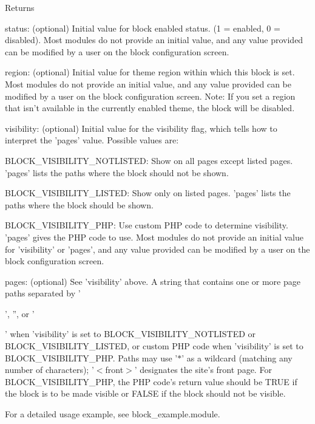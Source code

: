 \begin{DoxyReturn}{Returns}
\begin{DoxyItemize}
\item status: (optional) Initial value for block enabled status. (1 = enabled, 0 = disabled). Most modules do not provide an initial value, and any value provided can be modified by a user on the block configuration screen.
\item region: (optional) Initial value for theme region within which this block is set. Most modules do not provide an initial value, and any value provided can be modified by a user on the block configuration screen. Note: If you set a region that isn't available in the currently enabled theme, the block will be disabled.
\item visibility: (optional) Initial value for the visibility flag, which tells how to interpret the 'pages' value. Possible values are:
\begin{DoxyItemize}
\item BLOCK\_\-VISIBILITY\_\-NOTLISTED: Show on all pages except listed pages. 'pages' lists the paths where the block should not be shown.
\item BLOCK\_\-VISIBILITY\_\-LISTED: Show only on listed pages. 'pages' lists the paths where the block should be shown.
\item BLOCK\_\-VISIBILITY\_\-PHP: Use custom PHP code to determine visibility. 'pages' gives the PHP code to use. Most modules do not provide an initial value for 'visibility' or 'pages', and any value provided can be modified by a user on the block configuration screen.
\end{DoxyItemize}
\item pages: (optional) See 'visibility' above. A string that contains one or more page paths separated by '\par
', '', or '\par
' when 'visibility' is set to BLOCK\_\-VISIBILITY\_\-NOTLISTED or BLOCK\_\-VISIBILITY\_\-LISTED, or custom PHP code when 'visibility' is set to BLOCK\_\-VISIBILITY\_\-PHP. Paths may use '$\ast$' as a wildcard (matching any number of characters); '$<$front$>$' designates the site's front page. For BLOCK\_\-VISIBILITY\_\-PHP, the PHP code's return value should be TRUE if the block is to be made visible or FALSE if the block should not be visible.
\end{DoxyItemize}
\end{DoxyReturn}
For a detailed usage example, see block\_\-example.module.

